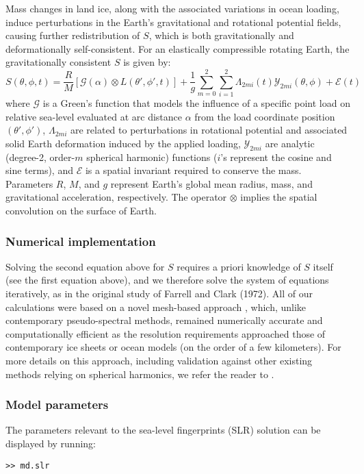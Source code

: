 Mass changes in land ice, along with the associated variations in ocean loading, induce perturbations in the Earth’s gravitational and rotational potential fields, causing further redistribution of $S$, which is both gravitationally and deformationally self-consistent. For an elastically compressible rotating Earth, the gravitationally consistent $S$ is given by:
\begin{equation}
	S(\theta,\phi,t) = \frac{R}{M} \left[ \mathcal{G}(\alpha) \otimes L(\theta',\phi',t) \right] +
	\frac{1}{g} \sum_{m=0}^{2} \sum_{i=1}^{2} \Lambda_{2mi} (t) \mathcal{Y}_{2mi} (\theta,\phi) +
	\mathcal{E}(t)
\end{equation}
where $\mathcal{G}$ is a Green’s function that models the influence of a specific point load on relative sea-level evaluated at arc distance $\alpha$ from the load coordinate position $(\theta',\phi')$, $\Lambda_{2mi}$ are related to perturbations in rotational potential and associated solid Earth deformation induced by the applied loading, $\mathcal{Y}_{2mi}$ are analytic (degree-2, order-$m$ spherical harmonic) functions ($i$’s represent the cosine and sine terms), and $\mathcal{E}$ is a spatial invariant required to conserve the mass. Parameters $R$, $M$, and $g$ represent Earth’s global mean radius, mass, and gravitational acceleration, respectively. The operator $\otimes$ implies the spatial convolution on the surface of Earth.

\subsubsection{Numerical implementation}
Solving the second equation above for $S$ requires a priori knowledge of $S$ itself (see the first equation above), and we therefore solve the system of equations iteratively, as in the original study of Farrell and Clark (1972). All of our calculations were based on a novel mesh-based approach \citep{Adhikari2016}, which, unlike contemporary pseudo-spectral methods, remained numerically accurate and computationally efficient as the resolution requirements approached those of contemporary ice sheets or ocean models (on the order of a few kilometers). For more details on this approach, including validation against other existing methods relying on spherical harmonics, we refer the reader to \cite{Adhikari2016}.

\subsubsection{Model parameters}
The parameters relevant to the sea-level fingerprints (SLR) solution can be displayed by running:
\begin{lstlisting}
>> md.slr
\end{lstlisting}

